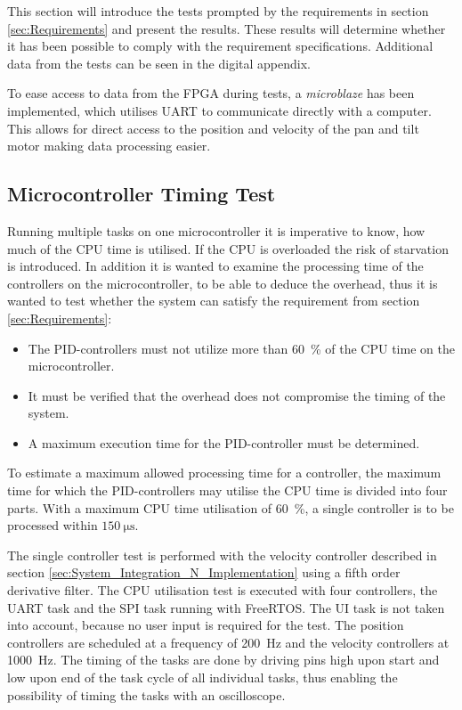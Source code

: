 \documentclass[../../main.tex]{subfiles}
\begin{document}
This section will introduce the tests prompted by the requirements in section \ref{sec:Requirements} and present the results. These results will determine whether it has been possible to comply with the requirement specifications. Additional data from the tests can be seen in the digital appendix. 

To ease access to data from the FPGA during tests, a \textit{microblaze} has been implemented, which utilises UART to communicate directly with a computer. This allows for direct access to the position and velocity of the pan and tilt motor making data processing easier. 

\subsection{Microcontroller Timing Test}
Running multiple tasks on one microcontroller it is imperative to know, how much of the CPU time is utilised. If the CPU is overloaded the risk of starvation is introduced. In addition it is wanted to examine the processing time of the controllers on the microcontroller, to be able to deduce the overhead, thus it is wanted to test whether the system can satisfy the requirement from section \ref{sec:Requirements}:
\begin{itemize}
    \item The PID-controllers must not utilize more than \SI{60}{\percent} of the CPU time on the microcontroller.
    \item It must be verified that the overhead does not compromise the timing of the system.
    \item A maximum execution time for the PID-controller must be determined.
\end{itemize}

To estimate a maximum allowed processing time for a controller, the maximum time for which the PID-controllers may utilise the CPU time is divided into four parts. With a maximum CPU time utilisation of \SI{60}{\percent}, a single controller is to be processed within $\SI{150}{\micro \second}$.

The single controller test is performed with the velocity controller described in section \ref{sec:System_Integration_N_Implementation} using a fifth order derivative filter. The CPU utilisation test is executed with four controllers, the UART task and the SPI task running with FreeRTOS. The UI task is not taken into account, because no user input is required for the test. The position controllers are scheduled at a frequency of \SI{200}{\hertz} and the velocity controllers at \SI{1000}{\hertz}. The timing of the tasks are done by driving pins high upon start and low upon end of the task cycle of all individual tasks, thus enabling the possibility of timing the tasks with an oscilloscope.
\end{document}

